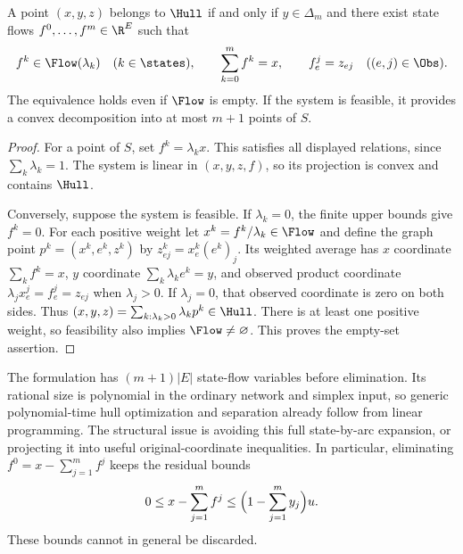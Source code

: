 \begin{proposition}\label{prop:disaggregation}
A point $(x,y,z)$ belongs to $\Hull$ if and only if $y\in\Delta_m$ and
there exist state flows $f^0,\ldots,f^m\in\R^E$ such that
\begin{equation}\label{eq:disaggregation}
 f^k\in\Flow(\lambda_k)\quad(k\in\states),\qquad
 \sum_{k=0}^m f^k=x,\qquad
 f^j_e=z_{ej}\quad((e,j)\in\Obs).
\end{equation}
The equivalence holds even if $\Flow$ is empty. If the system is feasible,
it provides a convex decomposition into at most $m+1$ points of $S$.
\end{proposition}
\begin{proof}
For a point of $S$, set $f^k=\lambda_k x$. This satisfies all displayed
relations, since $\sum_k\lambda_k=1$. The system is linear in
$(x,y,z,f)$, so its projection is convex and contains $\Hull$.

Conversely, suppose the system is feasible. If $\lambda_k=0$, the finite
upper bounds give $f^k=0$. For each positive weight let
$x^k=f^k/\lambda_k\in\Flow$ and define the graph point
$p^k=(x^k,e^k,z^k)$ by
$z^k_{ej}=x^k_e(e^k)_j$. Its weighted average has $x$ coordinate
$\sum_k f^k=x$, $y$ coordinate $\sum_k\lambda_k e^k=y$, and observed
product coordinate $\lambda_j x^j_e=f^j_e=z_{ej}$ when
$\lambda_j>0$. If $\lambda_j=0$, that observed coordinate is zero on both
sides. Thus $(x,y,z)=\sum_{k:\lambda_k>0}\lambda_k p^k\in\Hull$.
There is at least one positive weight, so feasibility also implies
$\Flow\ne\varnothing$. This proves the empty-set assertion.
\end{proof}

The formulation has $(m+1)|E|$ state-flow variables before elimination.
Its rational size is polynomial in the ordinary network and simplex input,
so generic polynomial-time hull optimization and separation already follow
from linear programming. The structural issue is avoiding this full
state-by-arc expansion, or projecting it into useful original-coordinate
inequalities. In particular, eliminating $f^0=x-\sum_{j=1}^m f^j$ keeps
the residual bounds
\begin{equation}\label{eq:residual-bounds}
 0\le x-\sum_{j=1}^m f^j\le
       \Bigl(1-\sum_{j=1}^m y_j\Bigr)u.
\end{equation}
These bounds cannot in general be discarded.

